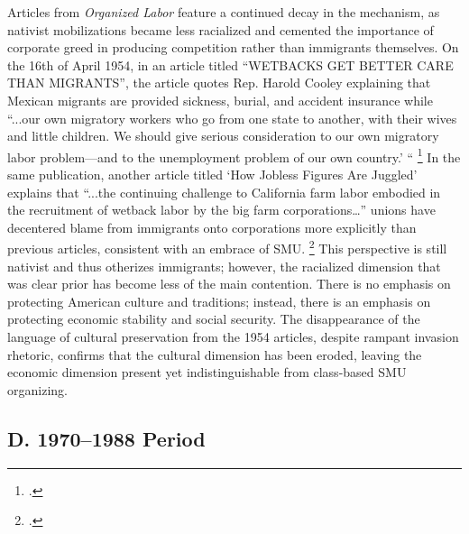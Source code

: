 \documentclass[12pt,a4paper]{article}
\begin{document}
Articles from \textit{Organized Labor} feature a continued decay in the mechanism, as nativist mobilizations became less racialized and cemented the importance of corporate greed in producing competition rather than immigrants themselves. On the 16th of April 1954, in an article titled “WETBACKS GET BETTER CARE THAN MIGRANTS”, the article quotes Rep. Harold Cooley explaining that Mexican migrants are provided sickness, burial, and accident insurance while “...our own migratory workers who go from one state to another, with their wives and little children. We should give serious consideration to our own migratory labor problem—and to the unemployment problem of our own country.’ “ \footcite{noauthor_wetbacks_1954}  In the same publication, another article titled ‘How Jobless Figures Are Juggled’ explains that “...the continuing challenge to California farm labor embodied in the recruitment of wetback labor by the big farm corporations…” unions have decentered blame from immigrants onto corporations more explicitly than previous articles, consistent with an embrace of SMU. \footcite{noauthor_survey_1954} This perspective is still nativist and thus otherizes immigrants; however, the racialized dimension that was clear prior has become less of the main contention. There is no emphasis on protecting American culture and traditions; instead, there is an emphasis on protecting economic stability and social security. The disappearance of the language of cultural preservation from the 1954 articles, despite rampant invasion rhetoric, confirms that the cultural dimension has been eroded, leaving the economic dimension present yet indistinguishable from class-based SMU organizing.



\subsection*{D. 1970--1988 Period}
\end{document}
